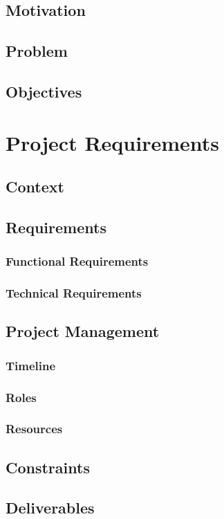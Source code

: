 \documentclass[a4paper,11pt,singlespacing]{article}
\begin{document}
    \subsection{Motivation}
    \subsection{Problem}
    \subsection{Objectives}

\section{Project Requirements}
    \subsection{Context}
    \subsection{Requirements}
        \subsubsection{Functional Requirements}
        \subsubsection{Technical Requirements}
    \subsection{Project Management}
        \subsubsection{Timeline}
        \subsubsection{Roles}
        \subsubsection{Resources}
    \subsection{Constraints}
    \subsection{Deliverables}
\end{document}
